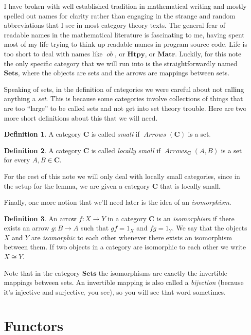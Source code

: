 \documentclass[12pt]{article}
\theoremstyle{definition}
\theoremstyle{definition}
\newtheorem{defn}{Definition}[]
\theoremstyle{definition}
\numberwithin{equation}{section}
\newcommand{\cat}[1]{\mathbf{#1}}      %
\newcommand{\fcat}[1]{{\mathbf {#1}}}    %
\newcommand{\CC}{\cat{C}}
\DeclareMathOperator{\Arrows}{\mathit{Arrows}}
\newcommand{\Set}{\fcat{Sets}}           %
\newcommand{\iso}{\cong}                %
\def\ni{\goodbreak\noindent}
\begin{document}
\goodbreak
I have broken with well established tradition in mathematical writing and mostly
spelled out names for clarity rather than engaging in the strange and random abbreviations
that I see in most category theory texts. The general fear of readable names in the
mathematical literature is fascinating to me, having spent most of my life trying to think
up readable names in program source code. Life is too short to deal with names like
$\mathop{\mathit{ob}}$, or $\cat{Htpy}$, or $\cat{Matr}$. Luckily, for this note the only
specific category that we will run into is the straightforwardly named $\Set$, 
where the objects are sets and the
arrows are mappings between sets.

Speaking of sets, in the definition of categories we were careful about not calling
anything a {\it set}. This is because some categories involve collections of things that
are too ``large'' to be called sets and not get into set theory trouble. Here are two more
short definitions about this that we will need.

\begin{defn}
A category $\CC$ is called {\it small} if $\Arrows(\CC)$ is a set.
\end{defn}

\begin{defn}
A category $\CC$ is called {\it locally small} if $\Arrows_{\CC}(A,B)$ is a set for every
$A, B \in \CC$. \end{defn}%
\ni
For the rest of this note we will only deal with locally small categories, since in the
setup for the lemma, we are given a category $\CC$ that is locally small.

Finally, one more notion that we'll need later is the idea of an {\it isomorphism}.

\begin{defn}
An arrow $f: X \to Y$ in a category $\CC$ is an {\it isomorphism} if there exists an arrow
$g: B \to A$ such that $gf = 1_X$ and $fg = 1_Y$. We say that the objects $X$ and $Y$ are
{\it isomorphic} to each other whenever there exists an isomorphism between them. If two
objects in a category are isomorphic to each other we write $X \iso Y$.
\end{defn}
\ni
Note that in the category $\Set$ the isomorphisms are exactly the invertible mappings
between sets. An invertible mapping is also called a {\it bijection} (because it's
injective and surjective, you see), so you will see that word sometimes.

\section{Functors}
\end{document}
